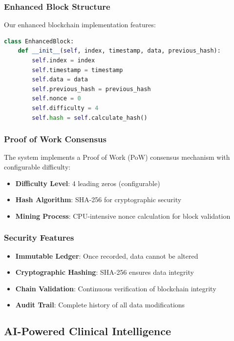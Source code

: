 \documentclass[conference]{IEEEtran}
\begin{document}
\subsubsection{Enhanced Block Structure}

Our enhanced blockchain implementation features:
\begin{lstlisting}[language=Python, caption=Enhanced Block Class]
class EnhancedBlock:
    def __init__(self, index, timestamp, data, previous_hash):
        self.index = index
        self.timestamp = timestamp
        self.data = data
        self.previous_hash = previous_hash
        self.nonce = 0
        self.difficulty = 4
        self.hash = self.calculate_hash()
\end{lstlisting}

\subsubsection{Proof of Work Consensus}

The system implements a Proof of Work (PoW) consensus mechanism with configurable difficulty:
\begin{itemize}
    \item \textbf{Difficulty Level}: 4 leading zeros (configurable)
    \item \textbf{Hash Algorithm}: SHA-256 for cryptographic security
    \item \textbf{Mining Process}: CPU-intensive nonce calculation for block validation
\end{itemize}

\subsubsection{Security Features}
\begin{itemize}
    \item \textbf{Immutable Ledger}: Once recorded, data cannot be altered
    \item \textbf{Cryptographic Hashing}: SHA-256 ensures data integrity
    \item \textbf{Chain Validation}: Continuous verification of blockchain integrity
    \item \textbf{Audit Trail}: Complete history of all data modifications
\end{itemize}

\subsection{AI-Powered Clinical Intelligence}
\end{document}
